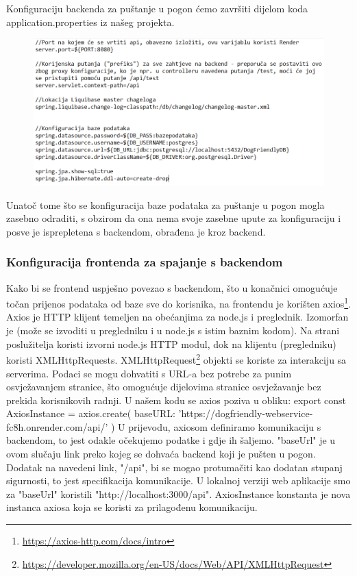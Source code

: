         
        Konfiguraciju backenda za puštanje u pogon ćemo završiti dijelom koda application.properties iz našeg projekta.

            \begin{figure}[H]
                \includegraphics[width=\textwidth]{slike/kod2.png} 
            \end{figure}
        
        Unatoč tome što se konfiguracija baze podataka za puštanje u pogon mogla zasebno odraditi, s obzirom da ona nema svoje zasebne upute za konfiguraciju i posve je isprepletena s backendom, obrađena je kroz backend.

        \newpage
        \subsubsection{Konfiguracija frontenda za spajanje s backendom}
        Kako bi se frontend uspješno povezao s backendom, što u konačnici omogućuje točan prijenos podataka od baze sve do korisnika, na frontendu je korišten axios\footnote{\url{https://axios-http.com/docs/intro}}. Axios je HTTP klijent temeljen na obećanjima za node.js i preglednik. Izomorfan je (može se izvoditi u pregledniku i u node.js s istim baznim kodom). Na strani poslužitelja koristi izvorni node.js HTTP modul, dok na klijentu (pregledniku) koristi XMLHttpRequests. XMLHttpRequest\footnote{\url{https://developer.mozilla.org/en-US/docs/Web/API/XMLHttpRequest}} objekti se koriste za interakciju sa serverima. Podaci se mogu dohvatiti s URL-a bez potrebe za punim osvježavanjem stranice, što omogućuje dijelovima stranice osvježavanje bez prekida korisnikovih radnji.
        U našem kodu se axios poziva u obliku: 
        export const AxiosInstance = axios.create({ baseURL: 'https://dogfriendly-webservice-fc8h.onrender.com/api/' })
        U prijevodu, axiosom definiramo komunikaciju s backendom, to jest odakle očekujemo podatke i gdje ih šaljemo. "baseUrl" je u ovom slučaju link preko kojeg se dohvaća backend koji je pušten u pogon. Dodatak na navedeni link, "/api", bi se mogao protumačiti kao dodatan stupanj sigurnosti, to jest specifikacija komunikacije. U lokalnoj verziji web aplikacije smo za "baseUrl" koristili "http://localhost:3000/api".
        AxiosInstance konstanta je nova instanca axiosa koja se koristi za prilagođenu komunikaciju.
        
